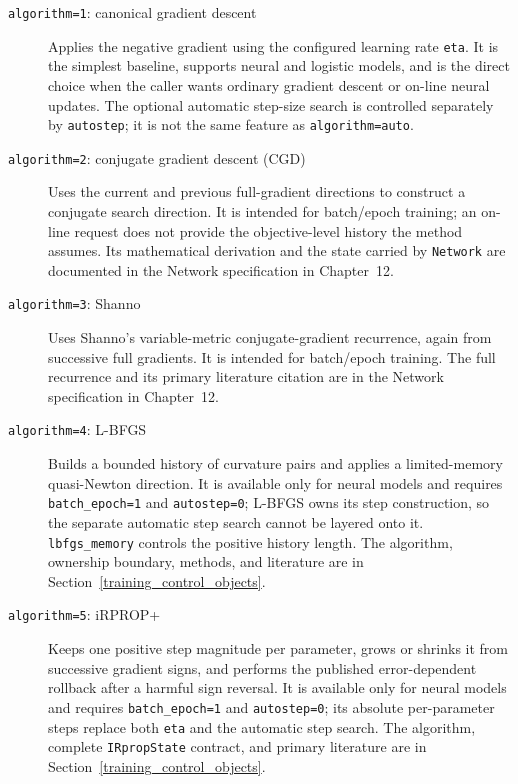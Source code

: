 \begin{description}
\item[\texttt{algorithm=1}: canonical gradient descent]
      Applies the negative gradient using the configured learning rate
      \texttt{eta}. It is the simplest baseline, supports neural and logistic
      models, and is the direct choice when the caller wants ordinary gradient
      descent or on-line neural updates. The optional automatic step-size search
      is controlled separately by \texttt{autostep}; it is not the same feature
      as \texttt{algorithm=auto}.
\item[\texttt{algorithm=2}: conjugate gradient descent (CGD)]
      Uses the current and previous full-gradient directions to construct a
      conjugate search direction. It is intended for batch/epoch training; an
      on-line request does not provide the objective-level history the method
      assumes. Its mathematical derivation and the state carried by
      \texttt{Network} are documented in the Network specification in
      Chapter~12.
\item[\texttt{algorithm=3}: Shanno]
      Uses Shanno's variable-metric conjugate-gradient recurrence, again from
      successive full gradients. It is intended for batch/epoch training. The
      full recurrence and its primary literature citation are in the Network
      specification in Chapter~12.
\item[\texttt{algorithm=4}: L-BFGS]
      Builds a bounded history of curvature pairs and applies a limited-memory
      quasi-Newton direction. It is available only for neural models and
      requires \texttt{batch\_epoch=1} and \texttt{autostep=0}; L-BFGS owns its
      step construction, so the separate automatic step search cannot be
      layered onto it. \texttt{lbfgs\_memory} controls the positive history
      length. The algorithm, ownership boundary, methods, and literature are in
      Section~\ref{training_control_objects}.
\item[\texttt{algorithm=5}: iRPROP+]
      Keeps one positive step magnitude per parameter, grows or shrinks it from
      successive gradient signs, and performs the published error-dependent
      rollback after a harmful sign reversal. It is available only for neural
      models and requires \texttt{batch\_epoch=1} and \texttt{autostep=0}; its
      absolute per-parameter steps replace both \texttt{eta} and the automatic
      step search. The algorithm, complete \texttt{IRpropState} contract, and
      primary literature are in Section~\ref{training_control_objects}.

\end{description}
